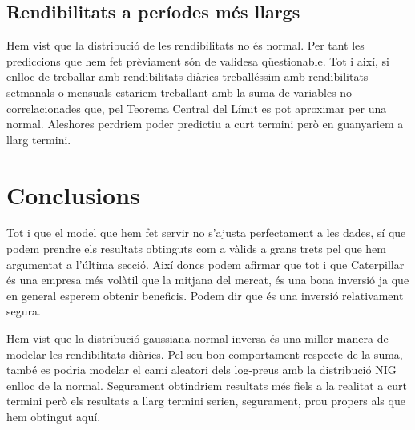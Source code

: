 \documentclass{article}
\numberwithin{table}{section}
\numberwithin{figure}{section}
\numberwithin{equation}{section}
\begin{document}
\subsection{Rendibilitats a períodes més llargs}
Hem vist que la distribució de les rendibilitats no és normal. Per tant les prediccions que hem fet prèviament són de validesa qüestionable. Tot i així, si enlloc de treballar amb rendibilitats diàries treballéssim amb rendibilitats setmanals o mensuals estariem treballant amb la suma de variables no correlacionades que, pel Teorema Central del Límit es pot aproximar per una normal. Aleshores perdriem poder predictiu a curt termini però en guanyariem a llarg termini.

\section{Conclusions}
Tot i que el model que hem fet servir no s'ajusta perfectament a les dades, sí que podem prendre els resultats obtinguts com a vàlids a grans trets pel que hem argumentat a l'última secció. Així doncs podem afirmar que tot i que Caterpillar és una empresa més volàtil que la mitjana del mercat, és una bona inversió ja que en general esperem obtenir beneficis. Podem dir que és una inversió relativament segura. 

Hem vist que la distribució gaussiana normal-inversa és una millor manera de modelar les rendibilitats diàries. Pel seu bon comportament respecte de la suma, també es podria modelar el camí aleatori dels log-preus amb la distribució NIG enlloc de la normal. Segurament obtindriem resultats més fiels a la realitat a curt termini però els resultats a llarg termini serien, segurament, prou propers als que hem obtingut aquí.

\printbibliography[heading = biblio]
\end{document}
